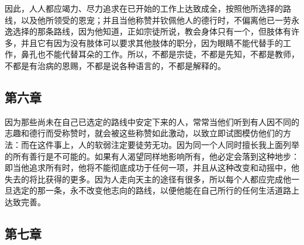 \par

因此，人人都应竭力、尽力追求在已开始的工作上达致成全，按照他所选择的路线，以及他所领受的恩宠；并且当他称赞并钦佩他人的德行时，不偏离他已一劳永逸选择的那条路线，因为他知道，正如宗徒所说，教会身体只有一个，但肢体有许多，并且它有因为没有肢体可以要求其他肢体的职分，因为眼睛不能代替手的工作，鼻孔也不能代替耳朵的工作。所以，不都是宗徒，不都是先知，不都是教师，不都是有治病的恩赐，不都是说各种语言的，不都是解释的。\par


\subsection{第六章}

\par

因为那些尚未在自己已选定的路线中安定下来的人，常常当他们听到有人因不同的志趣和德行而受称赞时，就会被这些称赞如此激动，以致立即试图模仿他们的方法：而在这件事上，人的软弱注定要徒劳无功。因为同一个人同时擅长我上面列举的所有善行是不可能的。如果有人渴望同样地影响所有，他必定会落到这种地步：即当他追求所有时，他将不能彻底成功于任何一项，并且从这种改变和动摇中，他失去的将比获得的更多。因为人走向天主的途径有很多，所以每个人都应完成他一旦选定的那一条，永不改变他志向的路线，以便他能在自己所行的任何生活道路上达致完善。\par


\subsection{第七章}

\par

